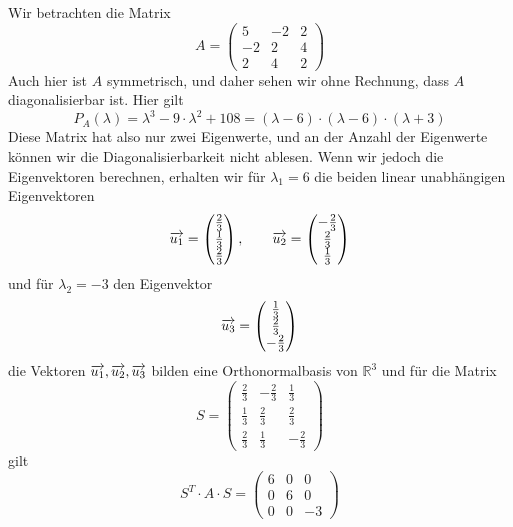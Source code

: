 \begin{beispiel} Wir betrachten die Matrix 
  	$$ A =  \left( \begin{matrix} 5 & -2 & 2 \\ -2 & 2 & 4 \\ 2 & 4 & 2 \end{matrix} \right) $$
Auch hier ist $A$ symmetrisch, und daher sehen wir ohne Rechnung, dass $A$ diagonalisierbar ist. Hier gilt
  	$$ P_A(\lambda) = \lambda^3 - 9 \cdot \lambda^2  + 108  
       = (\lambda -6)\cdot (\lambda - 6) \cdot (\lambda + 3) $$
Diese Matrix hat also nur zwei Eigenwerte, und an der Anzahl der Eigenwerte können wir die Diagonalisierbarkeit 
nicht ablesen. Wenn wir jedoch die Eigenvektoren berechnen, erhalten wir für $\lambda_1 = 6$ die beiden 
linear unabhängigen Eigenvektoren 
  	$$ \overrightarrow{u_1} = \left( \begin{matrix}  \frac {2}{3} \\ \frac {1}{3} \\ \frac {2}{3} 
   	\end{matrix} \right), \qquad 
   	\overrightarrow{u_2} = \left( \begin{matrix} - \frac {2}{3} \\ \frac {2}{3} \\ \frac {1}{3} 
   	\end{matrix} \right) $$
und für $\lambda_2 = -3$ den Eigenvektor
  	$$ \overrightarrow{u_3} = \left( \begin{matrix} \frac {1}{3} \\ \frac {2}{3} \\ -\frac {2}{3} 
   	\end{matrix} \right) $$
die Vektoren $ \overrightarrow{u_1},  \overrightarrow{u_2},  \overrightarrow{u_3}$  bilden eine 
Orthonormalbasis von $\mathbb R^3$ und für die Matrix
  	$$ S =  \left( \begin{matrix} \frac {2}{3} & -\frac {2}{3} & \frac {1}{3} \\
   	\frac {1}{3} & \frac {2}{3} & \frac {2}{3} \\ \frac {2}{3} & \frac {1}{3} & -\frac {2}{3}
   	\end{matrix} \right) $$ 
gilt
  	$$ S^T \cdot A \cdot S = \left( \begin{matrix} 6 & 0 & 0 \\ 0 & 6 & 0 \\ 0 & 0 & -3 \end{matrix} \right) $$ 
\end{beispiel}

\bigbreak


